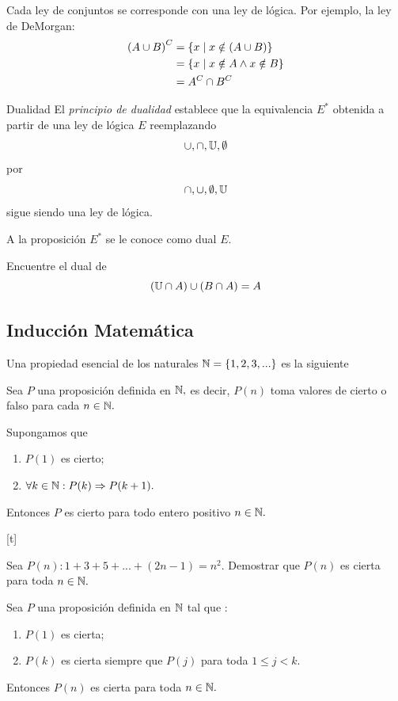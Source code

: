 	Cada ley de conjuntos se corresponde con una ley de lógica. Por ejemplo, la ley de DeMorgan:
	\begin{align*}
		\left(A \cup B\right)^{C} &= \left\{ x \mid x\notin(A \cup B) \right\}\\
		&= \left\{ x \mid x\notin A \wedge x\notin B \right\}\\
		&=A^{C}\cap B^{C}
	\end{align*}



	{Dualidad}
	El \emph{principio de dualidad} establece que la equivalencia $E^{*}$ obtenida a partir de una ley de lógica $E$ reemplazando
	\[ \cup, \cap, \mathbb{U}, \emptyset\] por
	\[ \cap, \cup, \emptyset, \mathbb{U}\]
	sigue siendo una ley de lógica.
	
	
	A la proposición $E^{*}$ se le conoce como dual $E.$



	\begin{exmp}
		Encuentre el dual de 
		\[ (\mathbb{U} \cap A) \cup (B\cap A) = A\]
	\end{exmp}


\subsection{Inducci\'on Matem\'atica}


	Una propiedad esencial de los naturales $\mathbb{N}=\left\{ 1,2,3,... \right\}$  es la siguiente
	
	
	\begin{ax}
		Sea $P$ una proposici\'on definida en $\mathbb{N},$ es decir, $P(n)$ toma valores de cierto o falso para cada $n\in \mathbb{N}.$
		
		Supongamos que
		\begin{enumerate}
			\item $P(1)$ es cierto;
			\item $\forall k \in \mathbb{N}: P(k) \Rightarrow P(k+1).$
		\end{enumerate}
		
		Entonces $P$ es cierto para todo entero positivo $n\in \mathbb{N}.$
	\end{ax}
	


[t]
	\begin{exmp}
		Sea $P(n):1+3+5+...+(2n-1)=n^2.$ Demostrar que $P(n)$ es cierta para toda $n \in \mathbb{N}.$ 
	\end{exmp}



	\begin{ax}
		Sea $P$ una proposici\'on definida en $\mathbb{N}$ tal que :
		\begin{enumerate}
			\item $P(1)$ es cierta;
			\item $P(k)$ es cierta siempre que $P(j)$ para toda $1\leq j < k.$
		\end{enumerate}
		Entonces $P(n)$ es cierta para toda $n\in \mathbb{N}.$
	\end{ax}
	



